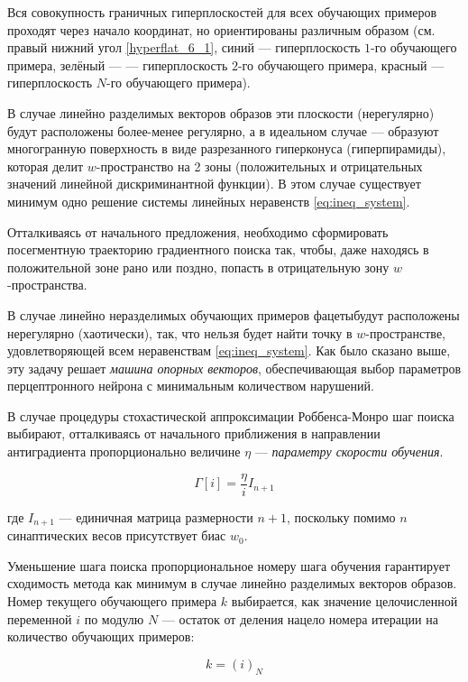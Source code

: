 \documentclass{article}
\numberwithin{equation}{subsection}
\begin{document}
Вся совокупность граничных гиперплоскостей для всех обучающих примеров проходят через 
начало координат, но ориентированы различным образом (см. правый нижний угол 
\ref{hyperflat_6_1}, синий --- гиперплоскость $1$-го обучающего примера, зелёный ---
--- гиперплоскость $2$-го обучающего примера, красный --- гиперплоскость $N$-го 
обучающего примера).

В случае линейно разделимых векторов образов эти плоскости (\glqq нерегулярно\grqq) 
будут расположены более-менее регулярно, а в идеальном случае --- образуют 
многогранную поверхность в виде разрезанного гиперконуса (гиперпирамиды), 
которая делит $w$-пространство на 2 зоны (положительных и отрицательных значений 
линейной дискриминантной функции).
В этом случае существует минимум одно решение системы линейных неравенств 
\ref{eq:ineq_system}.

Отталкиваясь от начального предложения, необходимо сформировать посегментную траекторию 
градиентного поиска так, чтобы, даже находясь в положительной зоне рано или поздно,
попасть в отрицательную зону $w$-пространства. 

В случае линейно неразделимых обучающих примеров \glqq фацеты\grqq будут расположены
нерегулярно (хаотически), так, что нельзя будет найти точку в $w$-пространстве, 
удовлетворяющей всем неравенствам \ref{eq:ineq_system}. Как было сказано выше,
эту задачу решает \textit{машина опорных векторов}, обеспечивающая выбор параметров
перцептронного нейрона с минимальным количеством нарушений.

В случае процедуры стохастической аппроксимации Роббенса-Монро шаг поиска выбирают,
отталкиваясь от начального приближения в направлении антиградиента пропорционально
величине $\eta$ --- \textit{параметру скорости обучения}.

\begin{equation}
    \Gamma[i] = \dfrac{\eta}{i} I_{n+1}
\end{equation}

\noindent
где $I_{n+1}$ --- единичная матрица размерности $n+1$, поскольку помимо $n$ синаптических
весов присутствует биас $w_0$.

Уменьшение шага поиска пропорциональное номеру шага обучения гарантирует сходимость метода
как минимум в случае линейно разделимых векторов образов.
Номер текущего обучающего примера $k$ выбирается, как значение целочисленной переменной $i$ 
по модулю $N$ --- остаток от деления нацело номера итерации на количество обучающих 
примеров:

\begin{equation*}
    k = (i)_N
\end{equation*}
\end{document}
